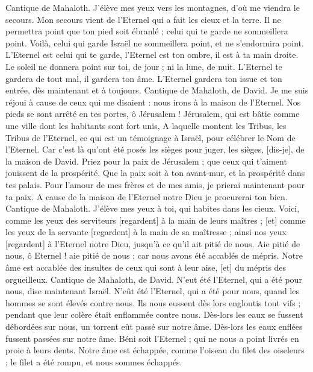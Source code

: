 \begin{multicols}{2}
\VerseOne{}Cantique de Mahaloth. J'élève mes yeux vers les montagnes, d'où me viendra le secours.
Mon secours vient de l'Eternel qui a fait les cieux et la terre.
Il ne permettra point que ton pied soit ébranlé ; celui qui te garde ne sommeillera point.
Voilà, celui qui garde Israël ne sommeillera point, et ne s'endormira point.
L'Eternel est celui qui te garde, l'Eternel est ton ombre, il est à ta main droite.
Le soleil ne donnera point sur toi, de jour ; ni la lune, de nuit.
L'Eternel te gardera de tout mal, il gardera ton âme.
L'Eternel gardera ton issue et ton entrée, dès maintenant et à toujours.
\VerseOne{}Cantique de Mahaloth, de David. Je me suis réjoui à cause de ceux qui me disaient : nous irons à la maison de l'Eternel.
Nos pieds se sont arrêté en tes portes, ô Jérusalem !
Jérusalem, qui est bâtie comme une ville dont les habitants sont fort unis,
A laquelle montent les Tribus, les Tribus de l'Eternel, ce qui est un témoignage à Israël, pour célébrer le Nom de l’Eternel.
Car c'est là qu'ont été posés les sièges pour juger, les sièges, [dis-je], de la maison de David.
Priez pour la paix de Jérusalem ; que ceux qui t'aiment jouissent de la prospérité.
Que la paix soit à ton avant-mur, et la prospérité dans tes palais.
Pour l'amour de mes frères et de mes amis, je prierai maintenant pour ta paix.
A cause de la maison de l'Eternel notre Dieu je procurerai ton bien.
\VerseOne{}Cantique de Mahaloth. J'élève mes yeux à toi, qui habites dans les cieux.
Voici, comme les yeux des serviteurs [regardent] à la main de leurs maîtres ; [et] comme les yeux de la servante [regardent] à la main de sa maîtresse ; ainsi nos yeux [regardent] à l'Eternel notre Dieu, jusqu’à ce qu'il ait pitié de nous.
Aie pitié de nous, ô Eternel ! aie pitié de nous ; car nous avons été accablés de mépris.
Notre âme est accablée des insultes de ceux qui sont à leur aise, [et] du mépris des orgueilleux.
\VerseOne{}Cantique de Mahaloth, de David. N'eut été l'Eternel, qui a été pour nous, dise maintenant Israël.
N'eût été l'Eternel, qui a été pour nous, quand les hommes se sont élevés contre nous.
Ils nous eussent dès lors engloutis tout vifs ; pendant que leur colère était enflammée contre nous.
Dès-lors les eaux se fussent débordées sur nous, un torrent eût passé sur notre âme.
Dès-lors les eaux enflées fussent passées sur notre âme.
Béni soit l'Eternel ; qui ne nous a point livrés en proie à leurs dents.
Notre âme est échappée, comme l'oiseau du filet des oiseleurs ; le filet a été rompu, et nous sommes échappés.

\end{multicols}
